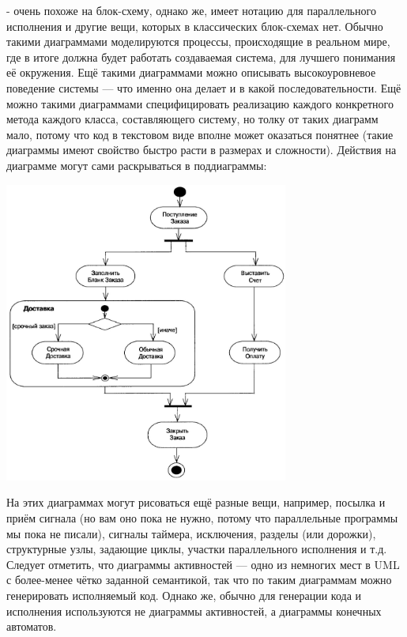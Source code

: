 \documentclass{../../text-style}
\begin{document}
 - очень похоже на блок-схему, однако же, имеет нотацию для параллельного исполнения и другие вещи, которых в классических блок-схемах нет. Обычно такими диаграммами моделируются процессы, происходящие в реальном мире, где в итоге должна будет работать создаваемая система, для лучшего понимания её окружения. Ещё такими диаграммами можно описывать высокоуровневое поведение системы --- что именно она делает и в какой последовательности. Ещё можно такими диаграммами специфицировать реализацию каждого конкретного метода каждого класса, составляющего систему, но толку от таких диаграмм мало, потому что код в текстовом виде вполне может оказаться понятнее (такие диаграммы имеют свойство быстро расти в размерах и сложности). Действия на диаграмме могут сами раскрываться в поддиаграммы:

\begin{center}
    \includegraphics[width=0.7\textwidth]{activitySubdiagrams.png}
\end{center}

На этих диаграммах могут рисоваться ещё разные вещи, например, посылка и приём сигнала (но вам оно пока не нужно, потому что параллельные программы мы пока не писали), сигналы таймера, исключения, разделы (или дорожки), структурные узлы, задающие циклы, участки параллельного исполнения и т.д. Следует отметить, что диаграммы активностей --- одно из немногих мест в UML с более-менее чётко заданной семантикой, так что по таким диаграммам можно генерировать исполняемый код. Однако же, обычно для генерации кода и исполнения используются не диаграммы активностей, а диаграммы конечных автоматов.
\end{document}
